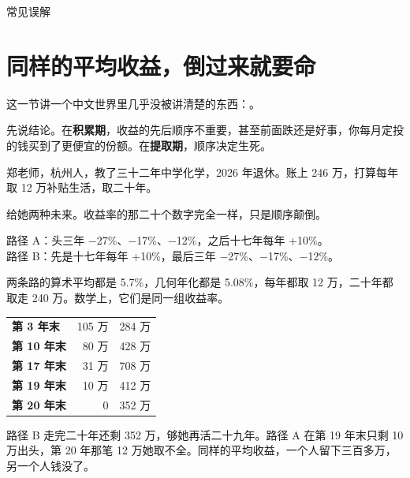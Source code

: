 \begin{mythbox}{常见误解}
\end{mythbox}

\section{同样的平均收益，倒过来就要命}

这一节讲一个中文世界里几乎没被讲清楚的东西：。

先说结论。在\textbf{积累期}，收益的先后顺序不重要，甚至前面跌还是好事，你每月定投的钱买到了更便宜的份额。在\textbf{提取期}，顺序决定生死。

郑老师，杭州人，教了三十二年中学化学，2026 年退休。账上 246 万，打算每年取 12 万补贴生活，取二十年。

给她两种未来。收益率的那二十个数字完全一样，只是顺序颠倒。

路径 A：头三年 −27\%、−17\%、−12\%，之后十七年每年 +10\%。\\ 路径 B：先是十七年每年 +10\%，最后三年 −27\%、−17\%、−12\%。

两条路的算术平均都是 5.7\%，几何年化都是 5.08\%，每年都取 12 万，二十年都取走 240 万。数学上，它们是同一组收益率。

\begin{tablewrap}
\begin{xltabular}{\linewidth}{Xrr}
\toprule
{} &  &  \\
\midrule
\textbf{第 3 年末} & 105 万 & 284 万 \\
\textbf{第 10 年末} & 80 万 & 428 万 \\
\textbf{第 17 年末} & 31 万 & 708 万 \\
\textbf{第 19 年末} & 10 万 & 412 万 \\
\textbf{第 20 年末} & 0 & 352 万 \\
\bottomrule
\end{xltabular}
\end{tablewrap}

路径 B 走完二十年还剩 352 万，够她再活二十九年。路径 A 在第 19 年末只剩 10 万出头，第 20 年那笔 12 万她取不全。同样的平均收益，一个人留下三百多万，另一个人钱没了。

